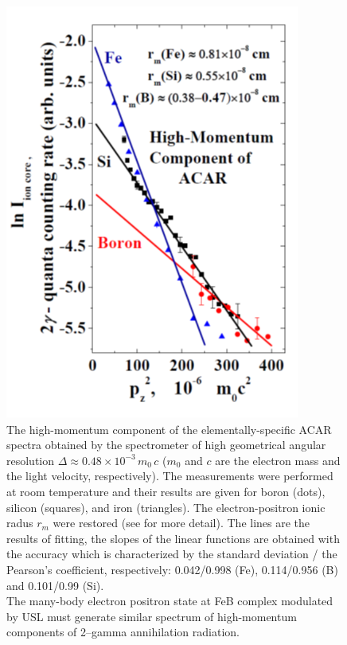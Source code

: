 \documentclass{ttp}
\begin{document}
\begin{figure}
	\centering
     \includegraphics[width=\linewidth]{Fig6.png}
	  \caption{The high-momentum component of the elementally-specific ACAR spectra
        obtained by the spectrometer of high geometrical angular resolution $\Delta \approx 0.48 \times 10^{-3}\,m_0\,c$
        ($m_0$ and $c$ are the electron mass and the light velocity, respectively).
        The measurements were performed at room temperature and their results are given
        for boron (dots), silicon (squares), and iron (triangles).
        The electron-positron ionic radus $r_m$ were restored (see \cite{Arutyunov2016,Arutyunov2006,Arutyunov2008} for more detail).
        The lines are the results of fitting, the slopes of the linear functions are obtained with the accuracy
        which is characterized by the standard deviation / the Pearson’s coefficient, respectively:
        0.042/0.998 (Fe), 0.114/0.956 (B) and 0.101/0.99 (Si).\\
        The many-body electron positron state at FeB complex modulated by USL must generate
        similar spectrum of high-momentum components of 2–gamma annihilation radiation.
}\label{fig6}
\end{figure}
\end{document}
